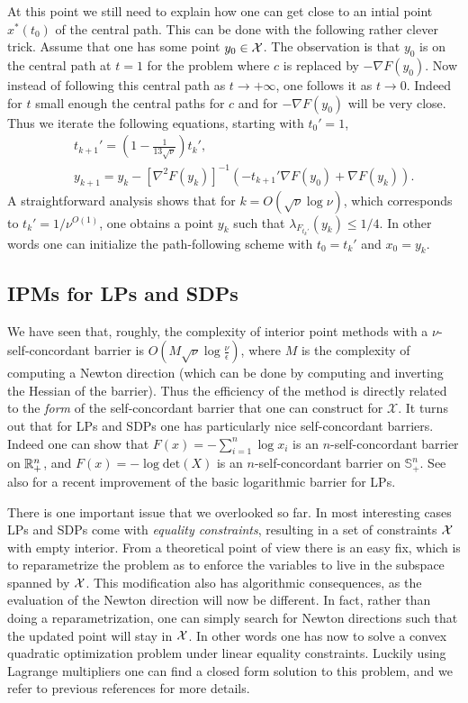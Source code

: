 At this point we still need to explain how one can get close to an intial point $x^*(t_0)$ of the central path. This can be done with the following rather clever trick. Assume that one has some point $y_0 \in \mathcal{X}$. The observation is that $y_0$ is on the central path at $t=1$ for the problem where $c$ is replaced by $- \nabla F(y_0)$. Now instead of following this central path as $t \to +\infty$, one follows it as $t \to 0$. Indeed for $t$ small enough the central paths for $c$ and for $- \nabla F(y_0)$ will be very close. Thus we iterate the following equations, starting with $t_0' = 1$,
\begin{eqnarray*}
& & t_{k+1}' = \left(1 - \frac1{13\sqrt{\nu}}\right) t_k' ,\\
& & y_{k+1} = y_k - [\nabla^2 F(y_k)]^{-1} (- t_{k+1}' \nabla F(y_0) + \nabla F(y_k) ) .
\end{eqnarray*}
A straightforward analysis shows that for $k = O(\sqrt{\nu} \log \nu)$, which corresponds to $t_k'=1/\nu^{O(1)}$, one obtains a point $y_k$ such that $\lambda_{F_{t_k'}}(y_k) \leq 1/4$. In other words one can initialize the path-following scheme with $t_0 = t_k'$ and $x_0 = y_k$.

\subsection{IPMs for LPs and SDPs}
We have seen that, roughly, the complexity of interior point methods with a $\nu$-self-concordant barrier is $O\left(M \sqrt{\nu} \log \frac{\nu}{\epsilon} \right)$, where $M$ is the complexity of computing a Newton direction (which can be done by computing and inverting the Hessian of the barrier). Thus the efficiency of the method is directly related to the {\em form} of the self-concordant barrier that one can construct for $\mathcal{X}$. It turns out that for LPs and SDPs one has particularly nice self-concordant barriers. Indeed one can show that $F(x) = - \sum_{i=1}^n \log x_i$ is an $n$-self-concordant barrier on $\mathbb{R}_{+}^n$, and $F(x) = - \log \mathrm{det}(X)$ is an $n$-self-concordant barrier on $\mathbb{S}_{+}^n$. See also \cite{LS13} for a recent improvement of the basic logarithmic barrier for LPs.

There is one important issue that we overlooked so far. In most interesting cases LPs and SDPs come with {\em equality constraints}, resulting in a set of constraints $\mathcal{X}$ with empty interior. From a theoretical point of view there is an easy fix, which is to reparametrize the problem as to enforce the variables to live in the subspace spanned by $\mathcal{X}$. This modification also has algorithmic consequences, as the evaluation of the Newton direction will now be different. In fact, rather than doing a reparametrization, one can simply search for Newton directions such that the updated point will stay in $\mathcal{X}$. In other words one has now to solve a convex quadratic optimization problem under linear equality constraints. Luckily using Lagrange multipliers one can find a closed form solution to this problem, and we refer to previous references for more details.